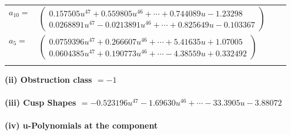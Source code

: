 \documentclass[1p]{elsarticle_modified}
\theoremstyle{definition}
\begin{document}
\begin{tabular}{m{7pt} m{180pt} m{7pt} m{180pt} }
\flushright $a_{10}=$&$\begin{pmatrix}0.157505 u^{47}+0.559805 u^{46}+\cdots+0.744089 u-1.23298\\0.0268891 u^{47}-0.0213891 u^{46}+\cdots+0.825649 u-0.103367\end{pmatrix}$ \\
\flushright $a_{5}=$&$\begin{pmatrix}0.0759396 u^{47}+0.266607 u^{46}+\cdots+5.41635 u+1.07005\\0.0604385 u^{47}+0.190773 u^{46}+\cdots-4.38559 u+0.332492\end{pmatrix}$\\&\end{tabular}
\flushleft \textbf{(ii) Obstruction class $= -1$}\\~\\
\flushleft \textbf{(iii) Cusp Shapes $= -0.523196 u^{47}-1.69630 u^{46}+\cdots-33.3905 u-3.88072$}\\~\\
\newpage\renewcommand{\arraystretch}{1}
\flushleft \textbf{(iv) u-Polynomials at the component}\newline \\
\end{document}
